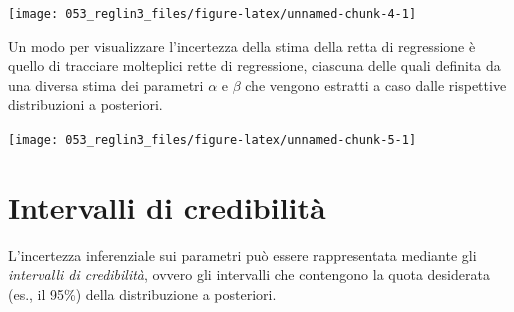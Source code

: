 \documentclass[
]{memoir}
\newenvironment{Shaded}{\begin{snugshade}}{\end{snugshade}}
\newcommand{\AttributeTok}[1]{\textcolor[rgb]{0.77,0.63,0.00}{#1}}
\newcommand{\ControlFlowTok}[1]{\textcolor[rgb]{0.13,0.29,0.53}{\textbf{#1}}}
\newcommand{\DecValTok}[1]{\textcolor[rgb]{0.00,0.00,0.81}{#1}}
\newcommand{\FunctionTok}[1]{\textcolor[rgb]{0.00,0.00,0.00}{#1}}
\newcommand{\NormalTok}[1]{#1}
\newcommand{\SpecialCharTok}[1]{\textcolor[rgb]{0.00,0.00,0.00}{#1}}
\newcommand{\StringTok}[1]{\textcolor[rgb]{0.31,0.60,0.02}{#1}}
\begin{document}
\begin{center}\texttt{[image: 053\_reglin3\_files/figure-latex/unnamed-chunk-4-1]} \end{center}

Un modo per visualizzare l'incertezza della stima della retta di regressione è quello di tracciare molteplici rette di regressione, ciascuna delle quali definita da una diversa stima dei parametri \(\alpha\) e \(\beta\) che vengono estratti a caso dalle rispettive distribuzioni a posteriori.

\begin{Shaded}
\end{Shaded}

\begin{center}\texttt{[image: 053\_reglin3\_files/figure-latex/unnamed-chunk-5-1]} \end{center}

\hypertarget{intervalli-di-credibilituxe0}{%
\section{Intervalli di credibilità}\label{intervalli-di-credibilituxe0}}

L'incertezza inferenziale sui parametri può essere rappresentata mediante gli \emph{intervalli di credibilità}, ovvero gli intervalli che contengono la quota desiderata (es., il 95\%) della distribuzione a posteriori.
\end{document}
